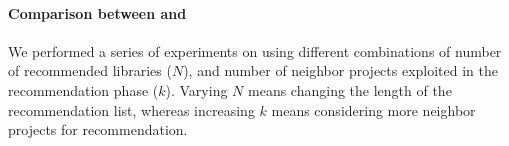 
\vspace{.1cm}
\noindent \revised{\rqfirst}
\vspace{-.05cm}




\noindent%


\paragraph{\textbf{Comparison between \LR and \CR}} We performed a series of experiments on  using different combinations of number of recommended libraries (\ie $N$), and number of neighbor projects exploited in the recommendation phase (\ie $k$). Varying $N$ means changing the length of the recommendation list, whereas increasing $k$ means considering more neighbor projects for recommendation.


